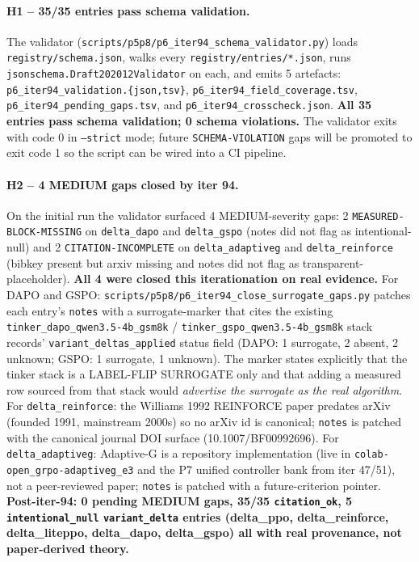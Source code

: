 \documentclass{article}
\begin{document}
\paragraph{H1 -- 35/35 entries pass schema validation.}
The validator (\texttt{scripts/p5p8/p6\_iter94\_schema\_validator.py}) loads
\texttt{registry/schema.json}, walks every \texttt{registry/entries/*.json},
runs \texttt{jsonschema.Draft202012Validator} on each, and emits 5 artefacts:
\texttt{p6\_iter94\_validation.\{json,tsv\}}, \texttt{p6\_iter94\_field\_coverage.tsv},
\texttt{p6\_iter94\_pending\_gaps.tsv}, and \texttt{p6\_iter94\_crosscheck.json}.
\textbf{All 35 entries pass schema validation; 0 schema violations.}
The validator exits with code 0 in \texttt{--strict} mode; future
\texttt{SCHEMA-VIOLATION} gaps will be promoted to exit code 1 so the script
can be wired into a CI pipeline.

\paragraph{H2 -- 4 MEDIUM gaps closed by iter 94.}
On the initial run the validator surfaced 4 MEDIUM-severity gaps: 2
\texttt{MEASURED-BLOCK-MISSING} on \texttt{delta\_dapo} and \texttt{delta\_gspo}
(notes did not flag as intentional-null) and 2 \texttt{CITATION-INCOMPLETE}
on \texttt{delta\_adaptiveg} and \texttt{delta\_reinforce} (bibkey present but
arxiv missing and notes did not flag as transparent-placeholder).
\textbf{All 4 were closed this iterationation on real evidence.}
For DAPO and GSPO: \texttt{scripts/p5p8/p6\_iter94\_close\_surrogate\_gaps.py}
patches each entry's \texttt{notes} with a surrogate-marker that cites the
existing \texttt{tinker\_dapo\_qwen3.5-4b\_gsm8k} / \texttt{tinker\_gspo\_qwen3.5-4b\_gsm8k}
stack records' \texttt{variant\_deltas\_applied} status field (DAPO: 1 surrogate,
2 absent, 2 unknown; GSPO: 1 surrogate, 1 unknown). The marker states explicitly
that the tinker stack is a LABEL-FLIP SURROGATE only and that adding a measured
row sourced from that stack would \emph{advertise the surrogate as the real
algorithm}. For \texttt{delta\_reinforce}: the Williams 1992 REINFORCE paper
predates arXiv (founded 1991, mainstream 2000s) so no arXiv id is canonical;
\texttt{notes} is patched with the canonical journal DOI surface
(10.1007/BF00992696). For \texttt{delta\_adaptiveg}: Adaptive-G is a repository
implementation (live in \texttt{colab-open\_grpo-adaptiveg\_e3} and the P7
unified controller bank from iter 47/51), not a peer-reviewed paper;
\texttt{notes} is patched with a future-criterion pointer.
\textbf{Post-iter-94: 0 pending MEDIUM gaps, 35/35 \texttt{citation\_ok},
5 \texttt{intentional\_null} \texttt{variant\_delta} entries (delta\_ppo,
delta\_reinforce, delta\_liteppo, delta\_dapo, delta\_gspo) all with real
provenance, not paper-derived theory.}
\end{document}
